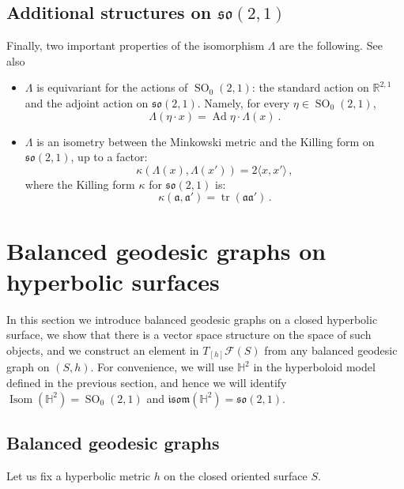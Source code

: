 \documentclass[11pt]{article}
\theoremstyle{definition}
\numberwithin{equation}{section}
\numberwithin{figure}{section}
\numberwithin{table}{section}
\newcommand{\Hyp}{\mathbb{H}}
\newcommand{\R}{{\mathbb R}}
\newcommand{\isom}{\mathfrak{isom}}
\newcommand{\so}{\mathfrak{so}}
\DeclareMathOperator{\tr}{tr}
\DeclareMathOperator{\Isom}{Isom}
\DeclareMathOperator{\Ad}{Ad}
\DeclareMathOperator{\SO}{SO}
\begin{document}
\subsection*{Additional structures on \texorpdfstring{$\so(2,1)$}{so(2,1)}}

Finally, two important properties of the isomorphism $\Lambda$ are the following. See also~\cite[Section~2]{ksurfaces}
\begin{itemize}
\item $\Lambda$ is equivariant for the actions of $\SO_0(2,1)$: the standard action on $\R^{2,1}$ and the adjoint action on $\so(2,1)$. Namely, for every $\eta\in\SO_0(2,1)$,
\begin{equation}
\Lambda(\eta\cdot x)=\Ad \eta\cdot \Lambda(x)~.
\end{equation}
\item $\Lambda$ is an isometry between the Minkowski metric and the Killing form on $\so(2,1)$, up to a factor:
\begin{equation}\label{eq killing mink}
\kappa(\Lambda({x}),\Lambda({x}'))=2\langle {x},{x}'\rangle\,,
\end{equation}
where the Killing form $\kappa$ for $\so(2,1)$ is:
\[
\kappa(\mathfrak a,\mathfrak a')=\tr(\mathfrak a\mathfrak a')\,.
\]
\end{itemize}



\section{Balanced geodesic graphs on hyperbolic surfaces}\label{sec balanced graph}



In this section we introduce balanced geodesic graphs on a closed hyperbolic surface, we show that there is a vector space structure on the space of such objects, and we construct an element in $T_{[h]}\mathcal F(S)$ from any balanced geodesic graph on $(S,h)$. For convenience, we will use $\Hyp^2$ in the hyperboloid model defined in the previous section, and hence we will identify $\Isom(\Hyp^2)=\SO_0(2,1)$ and $\isom(\Hyp^2)=\so(2,1)$.

\subsection{Balanced geodesic graphs}

Let us fix a hyperbolic metric $h$ on the closed oriented surface $S$.
\end{document}
